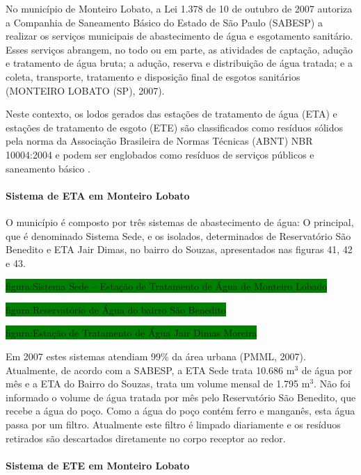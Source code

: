 	No município de Monteiro Lobato, a Lei 1.378 de 10 de outubro de 2007 autoriza a Companhia de Saneamento Básico do Estado de São Paulo (SABESP) a realizar os serviços municipais de abastecimento de água e esgotamento sanitário. Esses serviços abrangem, no todo ou em parte, as atividades de captação, adução e tratamento de água bruta; a adução, reserva e distribuição de água tratada; e a coleta, transporte, tratamento e disposição final de esgotos sanitários (MONTEIRO LOBATO (SP), 2007).

	Neste contexto, os lodos gerados das estações de tratamento de água (ETA) e estações de tratamento de esgoto (ETE) são classificados como resíduos sólidos pela norma da Associação Brasileira de Normas Técnicas (ABNT) NBR 10004:2004 e podem ser englobados como resíduos de serviços públicos e saneamento básico \cite{PERS2014}.
	
	\paragraph{\textbf{Sistema de ETA em Monteiro Lobato}}
	
	O município é composto por três sistemas de abastecimento de água: O principal, que é denominado Sistema Sede, e os isolados, determinados de Reservatório São Benedito e ETA Jair Dimas, no bairro do Souzas, apresentados nas figuras 41, 42 e 43. 
	
	\colorbox{green}{figura:Sistema Sede – Estação de Tratamento de Água de Monteiro Lobado}
	
	\colorbox{green}{figura:Reservatório de Água do bairro São Benedito}
	
	\colorbox{green}{figura:Estação de Tratamento de Água Jair Dimas Moreira}
	
	Em 2007 estes sistemas atendiam 99\% da área urbana (PMML, 2007). Atualmente, de acordo com a SABESP, a ETA Sede trata 10.686 m$^{3}$ de água por mês e a ETA do Bairro do Souzas, trata um volume mensal de 1.795 m$^{3}$. Não foi informado o volume de água tratada por mês pelo Reservatório São Benedito, que recebe a água do poço. Como a água do poço contém ferro e manganês, esta água passa por um filtro. Atualmente este filtro é limpado diariamente e os resíduos retirados são descartados diretamente no corpo receptor ao redor.
	
	\paragraph{\textbf{Sistema de ETE em Monteiro Lobato}}
	
